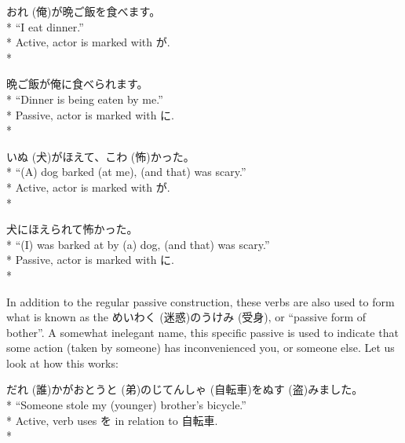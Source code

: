 \documentclass[11pt, b5paper, twoside, openright, onecolumn]{book}
\makeatletter
\newcommand*{\rubystack}[2]{{\relscale{0.5}%
  \begin{tabular}[b]{@{}c@{}}%
    {#1}\\%
   {\textscale{2}{#2}}%
  \end{tabular}}%
}
\DeclareRobustCommand*{\ruby}[2]{%
  \mbox{%
    \setlength{\parskip}{0ex}%
    \BeginAccSupp{method=pdfstringdef,ActualText={#1}}%
      \rubystack{\phantom{#2}}{#1}%
      \llap{%
        \rubystack{#2}{\phantom{#1}}%
      }%
    \EndAccSupp{}%
  }%
}
\renewcommand*{\ruby}[2]{#2 (#1)}%
\newenvironment{exampleblock}{
\setlength{\parindent}{0.6in}
\begin{minipage}[t]{\dimexpr\textwidth-\parindent}}
{\end{minipage}}
\makeatother
\begin{document}
\vspace{0.4cm}
\begin{exampleblock}
\ruby{俺}{おれ}が晩ご飯を食べます。 \\* 
“I eat dinner.” \\* 
Active‚ actor is marked with が. \\* 
\end{exampleblock}
\vspace{0.2cm}

\begin{exampleblock}
晩ご飯が俺に食べられます。 \\* 
“Dinner is being eaten by me.” \\* 
Passive‚ actor is marked with に. \\* 
\end{exampleblock}
\vspace{0.2cm}

\begin{exampleblock}
\ruby{犬}{いぬ}がほえて、\ruby{怖}{こわ}かった。 \\* 
“(A) dog barked (at me)‚ (and that) was scary.” \\* 
Active‚ actor is marked with が. \\* 
\end{exampleblock}
\vspace{0.2cm}

\begin{exampleblock}
犬にほえられて怖かった。 \\* 
“(I) was barked at by (a) dog‚ (and that) was scary.” \\* 
Passive‚ actor is marked with に. \\* 
\end{exampleblock}
\vspace{0.2cm}

In addition to the regular passive construction‚ these verbs are also used to form what is known as the \ruby{迷惑}{めいわく}の\ruby{受身}{うけみ}‚ or “passive form of bother”. A somewhat inelegant name‚ this specific passive is used to indicate that some action (taken by someone) has inconvenienced you‚ or someone else. Let us look at how this works:

\vspace{0.4cm}
\begin{exampleblock}
\ruby{誰}{だれ}かが\ruby{弟}{おとうと}の\ruby{自転車}{じてんしゃ}を\ruby{盗}{ぬす}みました。 \\* 
“Someone stole my (younger) brother’s bicycle.” \\* 
Active‚ verb uses を in relation to 自転車. \\* 
\end{exampleblock}
\vspace{0.2cm}
\end{document}
